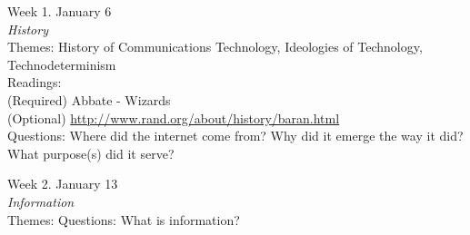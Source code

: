 \documentclass[10pt]{article}
\begin{document}





Week 1. January 6 \\
\textit{History} \\
Themes: History of Communications Technology, Ideologies of Technology, Technodeterminism \\
Readings: \\
(Required) Abbate - Wizards \\
(Optional) \url{http://www.rand.org/about/history/baran.html} \\
Questions: Where did the internet come from? Why did it emerge the way it did? What purpose(s) did it serve?

Week 2. January 13 \\
\textit{Information} \\
Themes: %
Questions:
What is information?
\end{document}
